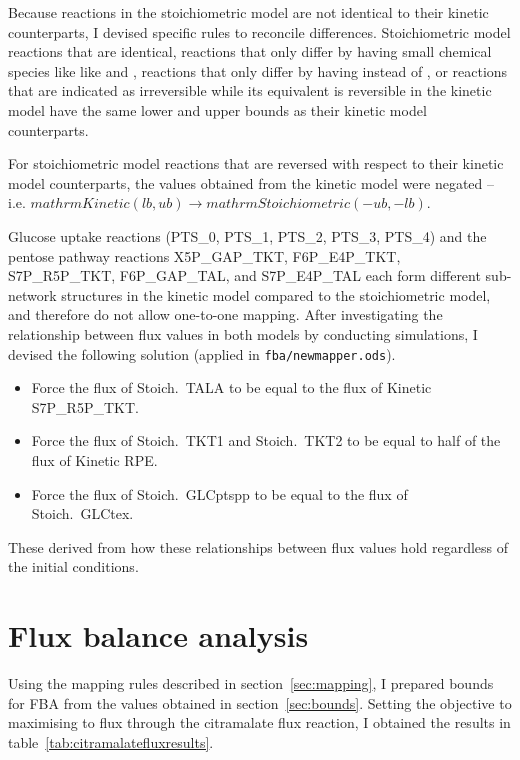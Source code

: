 \documentclass[parskip=full]{scrreprt}
\begin{document}
Because reactions in the stoichiometric model are not identical to their kinetic counterparts, I devised specific rules to reconcile differences. Stoichiometric model reactions that are identical, reactions that only differ by having small chemical species like like  and , reactions that only differ by having  instead of , or reactions that are indicated as irreversible while its equivalent is reversible in the kinetic model have the same lower and upper bounds as their kinetic model counterparts.

For stoichiometric model reactions that are reversed with respect to their kinetic model counterparts, the values obtained from the kinetic model were negated -- i.e. $ mathrm{Kinetic} (lb, ub) \rightarrow mathrm{Stoichiometric} (-ub, -lb)$.

Glucose uptake reactions (PTS\_0, PTS\_1, PTS\_2, PTS\_3, PTS\_4) and the pentose pathway reactions X5P\_GAP\_TKT, F6P\_E4P\_TKT, S7P\_R5P\_TKT, F6P\_GAP\_TAL, and S7P\_E4P\_TAL each form different sub-network structures in the kinetic model compared to the stoichiometric model, and therefore do not allow one-to-one mapping. After investigating the relationship between flux values in both models by conducting simulations, I devised the following solution (applied in \texttt{fba/newmapper.ods}).

\begin{itemize}
\item Force the flux of Stoich.\ TALA to be equal to the flux of Kinetic S7P\_R5P\_TKT.
\item Force the flux of Stoich.\ TKT1 and Stoich.\ TKT2 to be equal to half of the flux of Kinetic RPE.
\item Force the flux of Stoich.\ GLCptspp to be equal to the flux of Stoich.\ GLCtex.
\end{itemize}

These derived from how these relationships between flux values hold regardless of the initial conditions.

\section{Flux balance analysis}
\label{sec:fba}

Using the mapping rules described in section~\vref{sec:mapping}, I prepared bounds for FBA from the values obtained in section~\ref{sec:bounds}. Setting the objective to maximising to flux through the citramalate flux reaction, I obtained the results in table~\ref{tab:citramalatefluxresults}.
\end{document}
